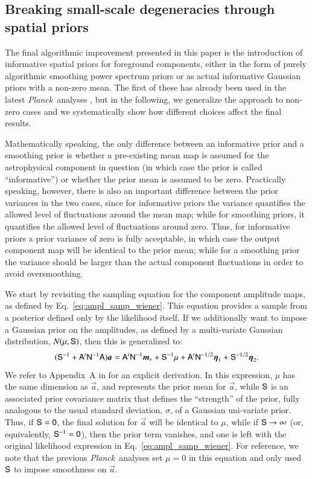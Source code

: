 \documentclass{aa}
\def\Planck{\textit{Planck}}
\newcommand{\A}[0]{\tens{A}}
\renewcommand{\a}[0]{\vec{a}}
\newcommand{\m}[0]{\vec{m}}
\newcommand{\N}[0]{\tens{N}}
\renewcommand{\S}[0]{\tens{S}}
\begin{document}
\subsection{Breaking small-scale degeneracies through spatial priors} 
\label{subsec:amplitude_priors}

The final algorithmic improvement presented in this paper is the
introduction of informative spatial priors for foreground components,
either in the form of purely algorithmic smoothing power spectrum
priors or as actual informative Gaussian priors with a non-zero
mean. The first of these has already been used in the latest
\Planck\ analyses \citep{planck2016-l04,npipe}, but in the following,
we generalize the approach to non-zero cases and we 
systematically show how different choices affect the final results.

Mathematically speaking, the only difference between an informative
prior and a smoothing prior is whether a pre-existing mean map is
assumed for the astrophysical component in question (in which case the
prior is called ``informative'') or whether the prior mean is assumed
to be zero. Practically speaking, however, there is also an important
difference between the prior variances in the two cases, since for
informative priors the variance quantifies the allowed level of
fluctuations around the mean map; while for smoothing priors, it
quantifies the allowed level of fluctuations around zero. Thus,
for informative priors a prior variance of zero is fully acceptable,
in which case the output component map will be identical to the prior
mean; while for a smoothing prior the variance should be larger than
the actual component fluctuations in order to avoid
oversmoothing. 

We start by revisiting the sampling equation for the component
amplitude maps, as defined by Eq.~\eqref{eq:ampl_samp_wiener}. This
equation provides a sample from a posterior defined only by the
likelihood itself. If we additionally want to impose a Gaussian prior
on the amplitudes, as defined by a multi-variate Gaussian
distribution, $N(\mu,\S)$, then this is generalized to: 
\begin{equation}
  (\S^{-1} + \A^t\N^{-1}\A)\a = \A^t\N^{-1}\m_{\nu} + \S^{-1}\mu + \A^t\N^{-1/2}\vec{\eta}_1 +
    \S^{-1/2}\vec{\eta}_2.
  \label{eq:gauss_highdim_prior}
\end{equation}
We refer to Appendix~A in \citet{bp01} for an explicit derivation. In this
expression, $\mu$ has the same dimension as $\a$, and represents the
prior mean for $\a$, while $\S$ is an associated prior covariance
matrix that defines the ``strength'' of the prior, fully analogous to
the usual standard deviation, $\sigma$, of a Gaussian uni-variate
prior. Thus, if $\S = \tens 0$, the final solution for $\a$ will be
identical to $\mu$, while if $\S\rightarrow\infty$ (or, equivalently,
$\S^{-1} = \tens 0$), then the prior term vanishes, and one is left with the
original likelihood expression in Eq.~\eqref{eq:ampl_samp_wiener}. For
reference, we note that the previous \Planck\ analyses
\citep{planck2016-l04,npipe} set $\mu=0$ in this equation and only
used $\S$ to impose smoothness on $\a$.
\end{document}
